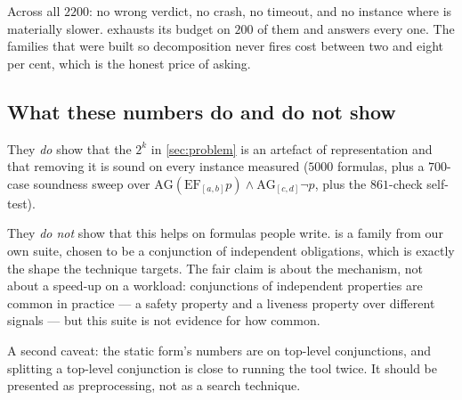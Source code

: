 Across all $2200$: no wrong verdict, no crash, no  timeout, and no
instance where  is materially slower.  exhausts its budget on
$200$ of them and  answers every one. The families that were built so
decomposition never fires cost between two and eight per cent, which is the
honest price of asking.

\subsection{What these numbers do and do not show}

They \emph{do} show that the $2^k$ in \cref{sec:problem} is an artefact of
representation and that removing it is sound on every instance measured
($5000$ formulas, plus a $700$-case soundness sweep over
$\mathrm{AG}(\mathrm{EF}_{[a,b]}p)\wedge\mathrm{AG}_{[c,d]}\neg p$, plus the
$861$-check self-test).

They \emph{do not} show that this helps on formulas people write.  is
a family from our own suite, chosen to be a conjunction of independent
obligations, which is exactly the shape the technique targets. The fair claim is
about the mechanism, not about a speed-up on a workload: conjunctions of
independent properties are common in practice --- a safety property and a
liveness property over different signals --- but this suite is not evidence for
how common.

A second caveat: the static form's numbers are on top-level conjunctions, and
splitting a top-level conjunction is close to running the tool twice. It should
be presented as preprocessing, not as a search technique.
